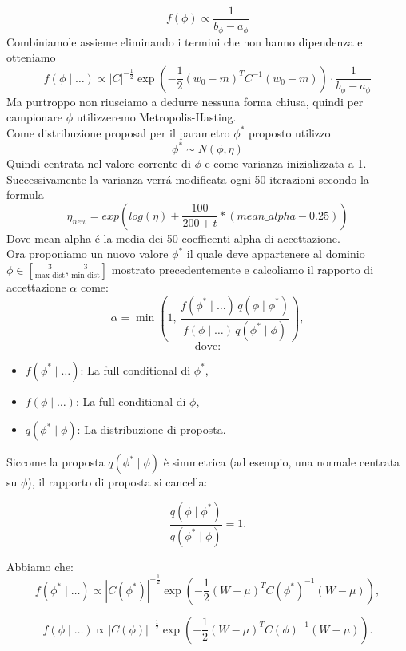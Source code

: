 \documentclass[a4paper,12pt]{article}
\begin{document}
\begin{itemize}
\begin{itemize}
			\[
			f(\phi) \propto \frac{1}{b_{\phi}-a_{\phi}}
			\]
			Combiniamole assieme eliminando i termini che non hanno dipendenza e otteniamo
			\[
			f(\phi \mid \dots) \propto |C|^{-\frac{1}{2}} \exp \left( -\frac{1}{2} (w_0 - m )^T C^{-1} (w_0 - m) \right) \cdot \frac{1}{b_{\phi}-a_{\phi}}
			\]
			Ma purtroppo non riusciamo a dedurre nessuna forma chiusa, quindi per campionare $\phi$ utilizzeremo Metropolis-Hasting.\\
			Come distribuzione proposal per il parametro $\phi^*$ proposto utilizzo
			\[
			\phi^* \sim N(\phi,\eta)
			\]
			Quindi centrata nel valore corrente di $\phi$ e come varianza inizializzata a 1.\\
			Successivamente la varianza verrá modificata ogni 50 iterazioni secondo la formula
			\[
			\eta_{new}=exp(log(\eta) + \frac{100}{200+t}*(mean \_ alpha - 0.25))
			\] 
			Dove mean$\_$alpha é la media dei 50 coefficenti alpha di accettazione.\\
			Ora proponiamo un nuovo valore $\phi^*$ il quale deve appartenere al dominio $\phi \in [\frac{3}{\text{max dist}}, \frac{3}{\text{min dist}}]$ mostrato precedentemente e calcoliamo il rapporto di accettazione $\alpha$ come:
			\[
			\alpha = \min \left( 1, \,
			\frac{f(\phi^* \mid \dots) \, q(\phi \mid \phi^*)}
			{f(\phi \mid \dots) \, q(\phi^* \mid \phi)} \right),
			\]
			\[
			\text{dove:}
			\]
			\begin{itemize}
				\item $f(\phi^* \mid \dots)$: La full conditional di $\phi^*$,
				\item $f(\phi \mid \dots)$: La full conditional di $\phi$,
				\item $q(\phi^* \mid \phi)$: La distribuzione di proposta.
			\end{itemize}
			
			Siccome la proposta $q(\phi^* \mid \phi)$ è simmetrica (ad esempio, una normale centrata su $\phi$), il rapporto di proposta si cancella:
			
			\[
			\frac{q(\phi \mid \phi^*)}{q(\phi^* \mid \phi)} = 1.
			\]
			
			Abbiamo che:
			\[
			f(\phi^* \mid \dots) \propto |C(\phi^*)|^{-\frac{1}{2}}
			\exp \left( 
			-\frac{1}{2} (W - \mu)^T C(\phi^*)^{-1} (W - \mu)
			\right),
			\]
			
			\[
			f(\phi \mid \dots) \propto |C(\phi)|^{-\frac{1}{2}}
			\exp \left( 
			-\frac{1}{2} (W - \mu)^T C(\phi)^{-1} (W - \mu)
			\right).
			\]
			

\end{itemize}
\end{itemize}
\end{document}
